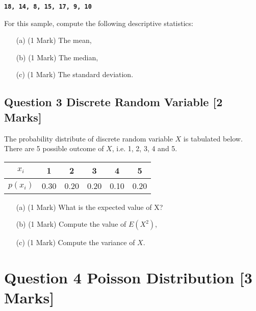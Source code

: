\documentclass[a4paper,12pt]{article}
\begin{document}
\begin{center}
\textbf{\texttt{18, 14,  8, 15, 17,  9, 10 }}
\end{center}

\noindent For this sample, compute the following descriptive statistics:
\begin{itemize}
\item[(a)] (1 Mark) The mean,
\item[(b)] (1 Mark) The median,
\item[(c)] (1 Mark) The standard deviation.
\end{itemize}

\newpage
\subsection*{Question 3 Discrete Random Variable [2 Marks]}
The probability distribute of discrete random variable $X$ is tabulated below. There are 5 possible outcome of $X$, i.e. 1, 2, 3, 4 and 5.
{
\large
\begin{center}
\begin{tabular}{|c||c|c|c|c|c|}
\hline
$x_i$  & 1 & 2 & 3 & 4 & 5  \\\hline
$p(x_i)$ & 0.30 & 0.20 & 0.20 & 0.10 & 0.20 \\
\hline
\end{tabular}
\end{center}
}
\begin{itemize}
\item[(a)] (1 Mark) What is the expected value of X?
\item[(b)] (1 Mark) Compute the value of $E(X^2)$,
\item[(c)] (1 Mark) Compute the variance of $X$.
\end{itemize}
\bigskip
\section*{Question 4 Poisson Distribution [3 Marks]}
\end{document}
